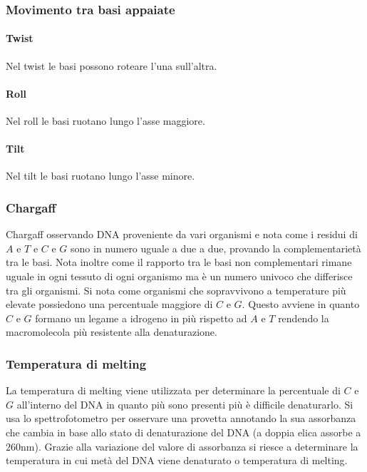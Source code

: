 		\subsubsection{Movimento tra basi appaiate}

			\paragraph{Twist}
			Nel twist le basi possono roteare l'una sull'altra.

			\paragraph{Roll}
			Nel roll le basi ruotano lungo l'asse maggiore.

			\paragraph{Tilt}
			Nel tilt le basi ruotano lungo l'asse minore.
			
		\subsubsection{Chargaff}
		Chargaff osservando DNA proveniente da vari organismi e nota come i residui di $A$ e $T$ e $C$ e $G$ sono in numero uguale a due a due, provando la complementariet\`a tra le basi. 
		Nota inoltre come il rapporto tra le basi non complementari rimane uguale in ogni tessuto di ogni organismo ma \`e un numero univoco che differisce tra gli organismi.
		Si nota come organismi che sopravvivono a temperature pi\`u elevate possiedono una percentuale maggiore di $C$ e $G$. 
		Questo avviene in quanto $C$ e $G$ formano un legame a idrogeno in pi\`u rispetto ad $A$ e $T$ rendendo la macromolecola pi\`u resistente alla denaturazione. 

		\subsubsection{Temperatura di melting}
		La temperatura di melting viene utilizzata per determinare la percentuale di $C$ e $G$ all'interno del DNA in quanto pi\`u sono presenti pi\`u \`e difficile denaturarlo. 
		Si usa lo spettrofotometro per osservare una provetta annotando la sua assorbanza che cambia in base allo stato di denaturazione del DNA (a doppia elica assorbe a $260\si{\nano\metre}$). 
		Grazie alla variazione del valore di assorbanza si riesce a determinare la temperatura in cui met\`a del DNA viene denaturato o temperatura di melting. 

